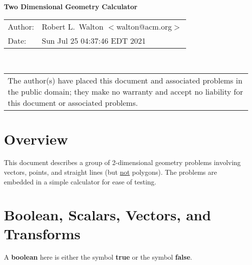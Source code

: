 \documentclass[12pt]{article}
\begin{document}
\newcommand{\header}[1]{\underline{\bf #1}}
\newcommand{\file}[1]{{\bf #1}}
\newcommand{\blankpage}{\newpage\vspace*{3.5in}%
    \centerline{\Large This Page is Intentionally Left Blank}}
\setlength{\parindent}{0.0in}
\setlength{\parskip}{1ex}
\newcommand{\key}[1]{{\bf #1}}
\newcommand{\TT}[1]{{\tt \bfseries #1}}
\newcommand{\EOL}{\penalty \exhyphenpenalty}
\newtheorem{definition}{Definition}[section]
\newtheorem{lemma}[definition]{Lemma}
\newtheorem{corollary}[definition]{Corollary}
\newtheorem{theorem}[definition]{Theorem}
\newtheorem{algorithm}[definition]{Algorithm}
\newenvironment{indpar}[1]%
    {\begin{list}{}{\setlength{\leftmargin}{#1}}\item[]}%
    {\end{list}}

\newcommand{\wh}{\,\widehat{~}\,}
\newcommand{\WH}{$\widehat{~}$}


\begin{center}
{\Large \bf Two Dimensional Geometry Calculator}

\begin{tabular}{ll}
Author:	      & Robert L.~Walton $<$walton@acm.org$>$ \\
Date:         & Sun Jul 25 04:37:46 EDT 2021
\end{tabular}
\\[2ex]
\begin{tabular}{p{5in}}
The author(s) have placed this document and associated problems
in the public domain;
they make no warranty and accept no liability for this document
or associated problems.
\end{tabular}

\end{center}

\medskip

\section{Overview}
This document describes a group of 2-dimensional geometry problems
involving vectors, points, and straight lines
(but \underline{not} polygons).
The problems are embedded in a simple calculator for ease of
testing.

\section{Boolean, Scalars, Vectors, and Transforms}
A \key{boolean} here is either the symbol \key{true} or the symbol \key{false}.
\end{document}
